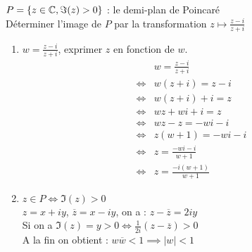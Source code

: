 \begin{exemple}
    $P = \left\{ z \in \mathbb{C}, \Im{(z)} > 0\right\}$ : le demi-plan de Poincaré    
    \\
    Déterminer l'image de $P$ par la transformation $z \mapsto \frac{z - i}{z + i}$
    \\
    \begin{enumerate}
        \item $w = \frac{z - i}{z + i}$, exprimer $z$ en fonction de $w$.
            \begin{align*}
                &w = \frac{z - i}{z + i} \\
                \iff &w(z + i) = z - i \\
                \iff &w(z + i) + i = z \\
                \iff &wz + wi + i = z \\
                \iff &wz - z = -wi - i \\
                \iff &z(w + 1) = -wi - i \\
                \iff &z = \frac{-wi - i}{w + 1} \\
                \iff &z = \frac{-i(w + 1)}{w + 1} 
            \end{align*}
        \item $z \in P \iff \Im{(z)} > 0$ 
            \\
            $z = x + iy$, $\overline{z} = x - iy$, on a : $z - \overline{z} = 2iy$ \\
            Si on a $\Im{(z)} = y > 0 \iff \frac{1}{2i}(z - \overline{z}) > 0$
            \\
            A la fin on obtient : $w\overline{w} < 1 \implies |w| < 1$
    \end{enumerate}
\end{exemple}

